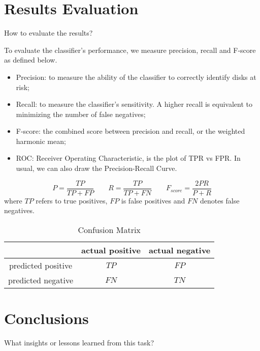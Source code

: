 \documentclass[12pt,a4paper,english]{amsart}
\begin{document}
%
\section{Results Evaluation}

How to evaluate the results?

To evaluate the classifier's performance, we measure precision, recall and F-score as defined below.
\begin{itemize}
	\item Precision: to measure the ability of the classifier to correctly identify disks at risk;
	\item Recall: to measure the classifier's sensitivity. A higher recall is equivalent to minimizing the number of false negatives;
	\item F-score: the combined score between precision and recall, or the weighted harmonic mean;
	\item ROC: Receiver Operating Characteristic, is the plot of TPR vs FPR. In usual, we can also draw the Precision-Recall Curve.
\end{itemize}

\begin{equation}
	P = \dfrac{TP}{TP+FP} \quad\quad 
	R = \dfrac{TP}{TP+FN} \quad\quad 
	F_{score} = \dfrac{2PR}{P+R}
\end{equation}
where $TP$ refers to true positives, $FP$ is false positives and $FN$ denotes false negatives.

\begin{table}
	\caption{Confusion Matrix}
	\centering
	\begin{tabular}{|c|c|c|}
		\hline
		& actual positive & actual negative \\
		\hline
		predicted positive & $TP$ & $FP$ \\
		\hline
		predicted negative & $FN$ & $TN$ \\
		\hline
	\end{tabular}
\end{table}
%
\section{Conclusions}

What insights or lessons learned from this task?

\cite{test}



\end{document}
